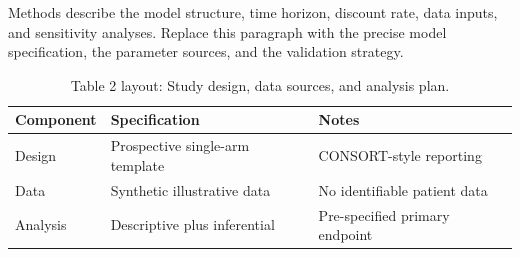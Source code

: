 
Methods describe the model structure, time horizon, discount rate, data inputs, and sensitivity analyses. Replace this paragraph with the precise model specification, the parameter sources, and the validation strategy.

\begin{table}[H]
\caption{Table 2 layout: Study design, data sources, and analysis plan.}
\label{tab:methods_design}
\centering
\begin{tabular}{>{\raggedright\arraybackslash}p{3.4cm} >{\raggedright\arraybackslash}p{4.6cm} >{\raggedright\arraybackslash}p{5.4cm}}
\toprule
\textbf{Component} & \textbf{Specification} & \textbf{Notes} \\
\midrule
  Design & Prospective single-arm template & CONSORT-style reporting \\
  Data & Synthetic illustrative data & No identifiable patient data \\
  Analysis & Descriptive plus inferential & Pre-specified primary endpoint \\
\bottomrule
\end{tabular}
\end{table}
